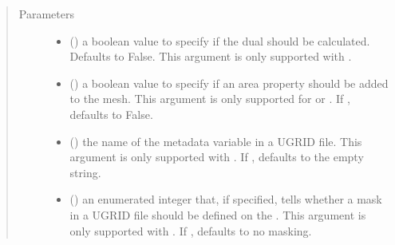 \documentclass[letterpaper,10pt,english]{sphinxmanual}
\begin{document}
\begin{fulllineitems}
\begin{quote}
\begin{description}
\begin{itemize}
\end{itemize}

\end{description}\end{quote}

\begin{quote}\begin{description}
\item[{Parameters}] \leavevmode\begin{itemize}
\item {} 
 () \textendash{} a boolean value to specify if the
dual {\hyperref[\detokenize{mesh:ESMF.api.mesh.Mesh}]{}} should be calculated.  Defaults to False.  This
argument is only supported with
{\hyperref[\detokenize{FileFormat:ESMF.api.constants.FileFormat.SCRIP}]{}}.

\item {} 
 () \textendash{} a boolean value to specify if an area
property should be added to the mesh.  This argument is only
supported for {\hyperref[\detokenize{FileFormat:ESMF.api.constants.FileFormat.SCRIP}]{}}
or {\hyperref[\detokenize{FileFormat:ESMF.api.constants.FileFormat.ESMFMESH}]{}}.
If , defaults to False.

\item {} 
 () \textendash{} the name of the {\hyperref[\detokenize{mesh:ESMF.api.mesh.Mesh}]{}} metadata variable in
a UGRID file.  This argument is only supported with
{\hyperref[\detokenize{FileFormat:ESMF.api.constants.FileFormat.UGRID}]{}}.
If , defaults to the empty string.

\item {} 
 ({\hyperref[\detokenize{MeshLoc:ESMF.api.constants.MeshLoc}]{}}) \textendash{} an enumerated integer that, if
specified, tells whether a mask in a UGRID file should be
defined on the .
This argument is only supported with
{\hyperref[\detokenize{FileFormat:ESMF.api.constants.FileFormat.UGRID}]{}}.
If , defaults to no masking.


\end{itemize}
\end{description}
\end{quote}
\end{fulllineitems}
\end{document}
